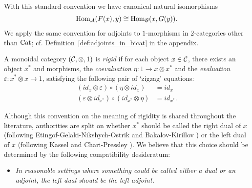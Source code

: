 \documentclass{amsart}
\begin{document}
\nid With this standard convention we have canonical natural isomorphisms
\begin{equation*}
	\operatorname{Hom}_\mathcal A(F(x), y) \cong \operatorname{Hom}_\mathcal B(x, G(y)).
\end{equation*}
We apply the same convention for adjoints to $1$-morphisms in $2$-categories other than $\mathrm{Cat}$; cf. Definition~\ref{def:adjoints_in_bicat} in the appendix.

\begin{definition} \label{def:rigid}
	A monoidal category $(\mathcal C, \otimes, 1)$ is {\em rigid} if for each object $x \in \mathcal C$, there exists an object $x^*$ and morphisms, the {\em coevaluation} $\eta: 1 \to x \otimes x^*$ and the {\em evaluation} $\varepsilon: x^* \otimes x \to 1$, satisfying the following pair of `zigzag' equations:
	\begin{align*}
		(id_{x} \otimes \varepsilon  ) \circ (  \eta \otimes id_{x}) &= id_{x} \\
		(\varepsilon \otimes id_{x^*}) \circ (id_{x^*} \otimes \eta) &= id_{x^*}.
	\end{align*}
\end{definition}

Although this convention on the meaning of rigidity is shared throughout the literature, authorities are split on whether $x^*$ should be called the right dual of $x$ (following Etingof-Gelaki-Nikshych-Ostrik \cite{EGNO} and Bakalov-Kirillov \cite{MR1797619})  or the left dual of $x$ (following Kassel \cite{MR1321145} and Chari-Pressley \cite{MR1358358}).  We believe that this choice should be determined by the following compatibility desideratum: 
\begin{itemize}
\item[]
	\emph{In reasonable settings where something could be called either a dual or an adjoint, the left dual should be the left adjoint.}
\end{itemize}
\end{document}
